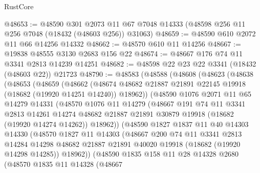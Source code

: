 \begin{lexlean}{RustCore}
\begin{coremodule}
@48653 := @48590
    @301
    @2073
    @11
    @67
    @7048
    @14333
    (@48598 @256 @11 @256 @7048 (@18432 (@48603 @256)) @31063)
@48659 := @48590 @610 @2072 @11 @66 @14256 @14332
@48662 := @48570 @610 @11 @14256
@48667 := @19838 @48555 @3130 @2683 @156 @22
@48674 := @48667 @176 @74 @11 @3341 @2813 @14239 @14251
@48682 := @48598 @22 @23 @22 @3341 (@18432 (@48603 @22)) @21723
@48790 := @48583
    (@48588
      (@48608
        (@48623
          (@48638
            (@48653
              (@48659
                (@48662
                  (@48674
                    @48682
                    @21887
                    @21891
                    @22145
                    @19918
                    (@18682 (@19920 @14251 @14240))
                    @18962))
                (@48590
                  @1076
                  @2071
                  @11
                  @65
                  @14279
                  @14331
                  (@48570
                    @1076
                    @11
                    @14279
                    (@48667
                      @191
                      @74
                      @11
                      @3341
                      @2813
                      @14261
                      @14274
                      @48682
                      @21887
                      @21891
                      @30879
                      @19918
                      (@18682 (@19920 @14274 @14262))
                      @18962))
                  (@48590
                    @1827
                    @1837
                    @11
                    @40
                    @14303
                    @14330
                    (@48570
                      @1827
                      @11
                      @14303
                      (@48667
                        @200
                        @74
                        @11
                        @3341
                        @2813
                        @14284
                        @14298
                        @48682
                        @21887
                        @21891
                        @40020
                        @19918
                        (@18682 (@19920 @14298 @14285))
                        @18962))
                    (@48590
                      @1835
                      @158
                      @11
                      @28
                      @14328
                      @2680
                      (@48570
                        @1835
                        @11
                        @14328
                        (@48667

\end{coremodule}
\end{lexlean}
